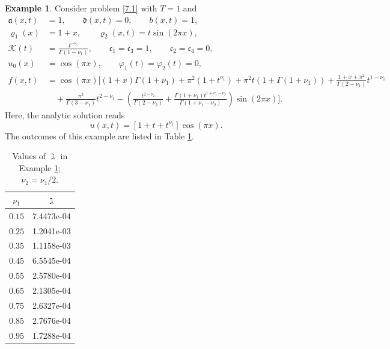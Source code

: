 \documentclass[reqno]{amsart}
\theoremstyle{definition}
\numberwithin{equation}{section}
\newtheorem{exAPP}{Example}[section]
\begin{document}
\begin{exAPP}\label{e.2}
Consider problem \eqref{7.1} with $T=1$ and
\begin{align*}
\mathfrak{a}(x,t)&=1,\qquad  \mathfrak{d}(x,t) = 0,\qquad
b(x,t) = 1, \\ \varrho_1(x) &= 1+x,\qquad \varrho_{2}(x,t) = t \sin(2\pi x),\\
\mathcal{K}(t)& = \frac{t^{-\nu_{1}}}{\Gamma(1-\nu_{1})},
 \qquad \mathfrak{c}_{1}=\mathfrak{c}_{3}=1,\qquad \mathfrak{c}_{2}=\mathfrak{c}_{4}=0, \\
u_{0}(x) &= \cos(\pi x),\qquad \varphi_{1}(t)=\varphi_{2}(t)=0,\\
f(x,t) &= \cos(\pi x)\bigg[(1+x)\Gamma(1+\nu_{1})+\pi^{2}(1+t^{\nu_{1}})+\pi^{2}t(1+
\Gamma(1+\nu_{1}))+\frac{1+x+\pi^{2}}{\Gamma(2-\nu_{1})}t^{1-\nu_{1}} \\
& \quad +\frac{\pi^{2}}{\Gamma(3-\nu_{1})}t^{2-\nu_{1}} - \left(\frac{t^{2-\nu_2}}{\Gamma(2-\nu_2)}+\frac{\Gamma(1+\nu_{1}) t^{1+\nu_{1}-\nu_2}}{\Gamma(1+\nu_{1}-\nu_2)}\right)\sin(2\pi x) \bigg].
\end{align*}
Here, the analytic solution reads
\[
u(x,t)=[1+t+t^{\nu_{1}}]\cos(\pi x).
\]
The outcomes of this example are listed in Table \ref{tab:table2}.
\begin{table}[htbp]
  \begin{center}
    \caption{Values of $\gimel$ in Example \ref{e.2}; $\nu_2=\nu_{1}/2$.}
    \label{tab:table2}
    \begin{tabular}{c|c}
      \hline
     $\nu_{1}$ &$\gimel$\\
		 \hline
		$0.15$& 7.4473e-04 \\
		$0.25$& 1.2041e-03\\
		$0.35$& 1.1158e-03\\
		$0.45$& 6.5545e-04\\
		$0.55$& 2.5780e-04\\
		$0.65$& 2.1305e-04\\
		$0.75$& 2.6327e-04\\
		$0.85$& 2.7676e-04\\
		$0.95$& 1.7288e-04\\
				\end{tabular}
  \end{center}
\end{table}
\end{exAPP}
\end{document}
